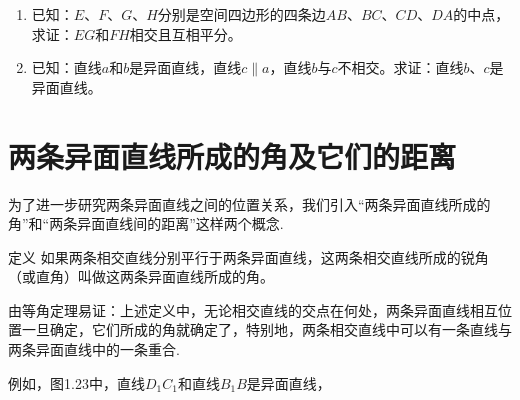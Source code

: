 \begin{enumerate}
\begin{minipage}{.48\textwidth}
\end{minipage}
\hfill
\begin{minipage}{.48\textwidth}
\centering
{}
\end{minipage}

\item 已知：$E$、$F$、$G$、$H$分别是空间四边形的四条边$AB$、$BC$、$CD$、$DA$的中点，求证：$EG$和$FH$相交且互相平分。
\item 已知：直线$a$和$b$是异面直线，直线$c\parallel a$，直线$b$与$c$不相交。求证：直线$b$、$c$是异面直线。
\end{enumerate}

\section{两条异面直线所成的角及它们的距离}
为了进一步研究两条异面直线之间的位置关系，我们引入“两条异面直线所成的角”和“两条异面直线间的距离”这样两个概念.

\begin{thm}
 {定义} 如果两条相交直线分别平行于两条异面直线，这两条相交直线所成的锐角（或直角）叫做这两条异面直线所成的角。   
\end{thm}

由等角定理易证：上述定义中，无论相交直线的交点在何处，两条异面直线相互位置一旦确定，它们所成的角就确定了，特别地，两条相交直线中可以有一条直线与两条异面直线中的一条重合.

例如，图1.23中，直线$D_1C_1$和直线$B_1B$是异面直线，

